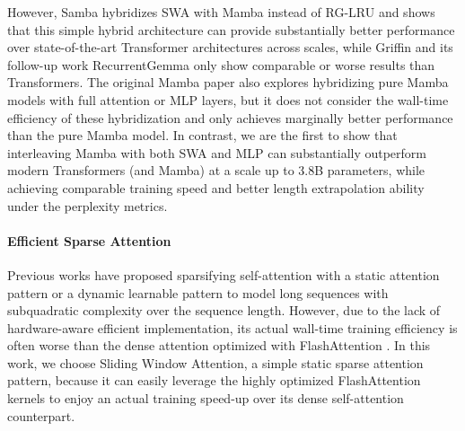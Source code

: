 \documentclass{article}
\begin{document}
However, Samba hybridizes SWA with Mamba instead of RG-LRU and shows that this simple hybrid architecture can provide substantially better performance over state-of-the-art Transformer architectures across scales, while Griffin and its follow-up work RecurrentGemma \citep{botev2024recurrentgemma} only show comparable or worse results than Transformers. The original Mamba paper \citep{gu2023mamba} also explores hybridizing pure Mamba models with full attention or MLP layers, but it does not consider the wall-time efficiency of these hybridization and only achieves marginally better performance than the pure Mamba model. In contrast, we are the first to show that interleaving Mamba with both SWA and MLP can substantially outperform modern Transformers (and Mamba) at a scale up to 3.8B parameters, while achieving comparable training speed and better length extrapolation ability under the perplexity metrics. 

\paragraph{Efficient Sparse Attention} Previous works have proposed sparsifying self-attention \citep{vaswani2017attention} with a static attention pattern \citep{child2019generating,zaheer2020big,beltagy2020longformer} or a dynamic learnable pattern \citep{routing,kitaev2020reformer,ren2023sparse} to model long sequences with subquadratic complexity over the sequence length. However, due to the lack of hardware-aware efficient implementation, its actual wall-time training efficiency is often worse than the dense attention optimized with FlashAttention \citep{dao2022flashattention,dao2023flashattention2,shah2024flashattention3}. In this work, we choose Sliding Window Attention, a simple static sparse attention pattern, because it can easily leverage the highly optimized FlashAttention kernels to enjoy an actual training speed-up over its dense self-attention counterpart.
\end{document}
